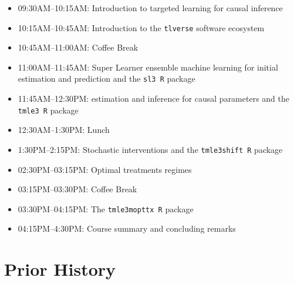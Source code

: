 \documentclass[a4paper,11pt]{texMemo}
\newcommand{\note}[2][]{\added[#1,remark={#2}]{}}
\begin{document}
\vspace{3in}

\note[id=RP]{Below I drafted an alternative schedule}

\begin{itemize}
  \itemsep0pt
  \item 09:30AM--10:15AM: Introduction to targeted learning for causal inference
  \item 10:15AM--10:45AM: Introduction to the \texttt{tlverse} software ecosystem
  \item 10:45AM--11:00AM: Coffee Break
  \item 11:00AM--11:45AM: Super Learner ensemble machine learning for initial estimation and prediction and the \texttt{sl3 R} package
  \item 11:45AM--12:30PM: estimation and inference for causal parameters and the \texttt{tmle3 R} package
  \item 12:30AM--1:30PM: Lunch
  \item 1:30PM--2:15PM: Stochastic interventions and the \texttt{tmle3shift R} package
  \item 02:30PM--03:15PM: Optimal treatments regimes
  \item 03:15PM--03:30PM: Coffee Break
  \item 03:30PM--04:15PM: The \texttt{tmle3mopttx R} package
  \item 04:15PM--4:30PM: Course summary and concluding remarks
\end{itemize}


\section{Prior History}


\end{document}
